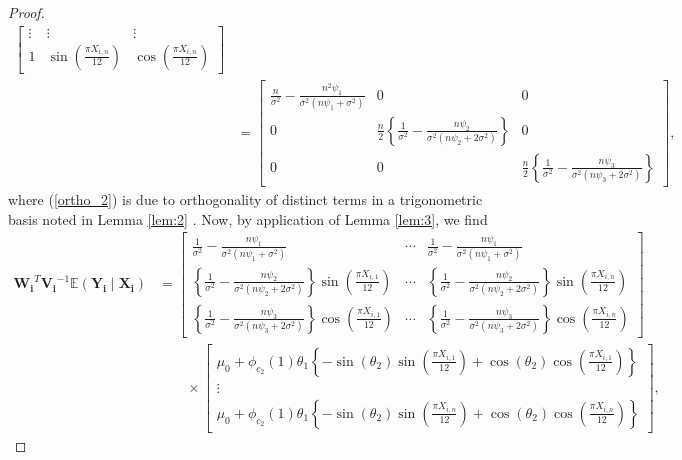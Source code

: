 \begin{proof}
\begin{align}
\begin{bmatrix}
    \vdots & \vdots & \vdots \\
    1 & \sin\left(\frac{\pi X_{i,n}}{12}\right) & \cos\left(\frac{\pi X_{i,n}}{12}\right) 
    \end{bmatrix} \nonumber \\
    &= \begin{bmatrix}\frac{n}{\sigma^2} - \frac{n^2\psi_1}{\sigma^2(n\psi_1+\sigma^2)} & 0 & 0 \\
    0 & \frac{n}{2}\left\{\frac{1}{\sigma^2} - \frac{n\psi_2}{\sigma^2(n\psi_2+2\sigma^2)}\right\} & 0 \\
    0 & 0 & \frac{n}{2}\left\{\frac{1}{\sigma^2} - \frac{n\psi_3}{\sigma^2(n\psi_3+2\sigma^2)}\right\}  \end{bmatrix}, \label{ortho_2}
\end{align}
where (\ref{ortho_2}) is due to orthogonality of distinct terms in a trigonometric basis noted in Lemma \ref{lem:2} \citep[Lemma 1.7]{Tsybakov2009}. Now, by application of Lemma \ref{lem:3}, we find
\begin{align}
\boldsymbol{W_i}^T\boldsymbol{V_i}^{-1}\mathbb{E}(\boldsymbol{Y_i}\mid \boldsymbol{X_i}) 
&= \begin{bmatrix} \frac{1}{\sigma^2} - \frac{n\psi_1}{\sigma^2(n\psi_1+\sigma^2)} & \cdots & \frac{1}{\sigma^2} - \frac{n\psi_1}{\sigma^2(n\psi_1+\sigma^2)} \\
 \left\{\frac{1}{\sigma^2} - \frac{n\psi_2}{\sigma^2(n\psi_2+2\sigma^2)}\right\}\sin\left(\frac{\pi X_{i,1}}{12}\right) & \cdots & \left\{\frac{1}{\sigma^2} - \frac{n\psi_2}{\sigma^2(n\psi_2+2\sigma^2)}\right\}\sin\left(\frac{\pi X_{i,n}}{12}\right)\\
 \left\{\frac{1}{\sigma^2} - \frac{n\psi_3}{\sigma^2(n\psi_3+2\sigma^2)}\right\}\cos\left(\frac{\pi X_{i,1}}{12}\right) & \cdots & \left\{\frac{1}{\sigma^2} - \frac{n\psi_3}{\sigma^2(n\psi_3+2\sigma^2)}\right\}\cos\left(\frac{\pi X_{i,n}}{12}\right)
\end{bmatrix} \nonumber \\
&\quad \quad \times 
\begin{bmatrix}
\mu_0 + \phi_{c_2}(1)\theta_1\left\{- \sin(\theta_2)\sin\left(\frac{\pi X_{i,1}}{12} \right) + \cos(\theta_2)\cos\left(\frac{\pi X_{i,1}}{12} \right)\right\} \\
\vdots \\
\mu_0 + \phi_{c_2}(1)\theta_1\left\{- \sin(\theta_2)\sin\left(\frac{\pi X_{i,n}}{12} \right) + \cos(\theta_2)\cos\left(\frac{\pi X_{i,n}}{12} \right)\right\}
\end{bmatrix}, \nonumber 

\end{align}
\end{proof}
